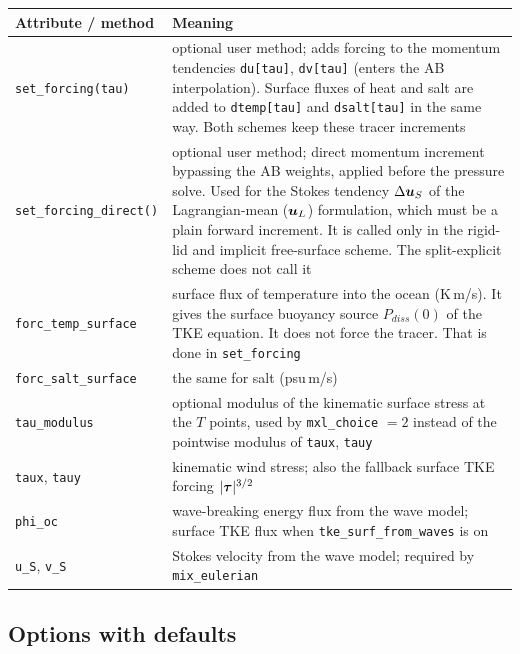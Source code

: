 \documentclass[12pt]{article}
\renewcommand{\v}[1]{{\mbox{\boldmath$ #1 $}}}  %
\begin{document}
\begin{longtable}{@{}lp{10.6cm}@{}}
\hline
Attribute / method & Meaning \\
\hline
\endhead
\verb|set_forcing(tau)| & optional user method; adds forcing to the momentum
  tendencies \verb|du[tau]|, \verb|dv[tau]| (enters the AB interpolation).
  Surface fluxes of heat and salt are added to \verb|dtemp[tau]| and
  \verb|dsalt[tau]| in the same way. Both schemes keep these tracer
  increments \\
\verb|set_forcing_direct()| & optional user method; direct momentum increment
  bypassing the AB weights, applied before the pressure solve. Used for the
  Stokes tendency $\Delta \v u_S$ of the Lagrangian-mean ($\v u_L$)
  formulation, which must be a plain forward increment.
  It is called only in the rigid-lid and implicit free-surface scheme.
  The split-explicit scheme does not call it \\
\verb|forc_temp_surface| & surface flux of temperature into the ocean
  (K\,m/s). It gives the surface buoyancy source $P_{diss}(0)$ of the TKE
  equation. It does not force the tracer. That is done in \verb|set_forcing| \\
\verb|forc_salt_surface| & the same for salt (psu\,m/s) \\
\verb|tau_modulus| & optional modulus of the kinematic surface stress at the
  $T$ points, used by \verb|mxl_choice| $=2$ instead of the pointwise modulus
  of \verb|taux|, \verb|tauy| \\
\verb|taux|, \verb|tauy| & kinematic wind stress; also the fallback surface
  TKE forcing $|\v \tau|^{3/2}$ \\
\verb|phi_oc| & wave-breaking energy flux from the wave model; surface TKE
  flux when \verb|tke_surf_from_waves| is on \\
\verb|u_S|, \verb|v_S| & Stokes velocity from the wave model; required by
  \verb|mix_eulerian| \\
\hline
\end{longtable}

\subsection*{Options with defaults}
\end{document}
